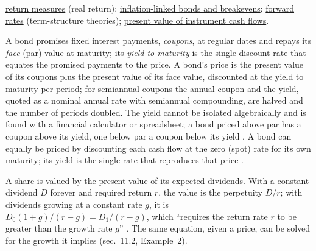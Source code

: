 \begin{qfdefinition}
 \hyperref[def:return-measures]{return measures} (real return); \hyperref[def:tips-breakevens]{inflation-linked bonds and breakevens}; \hyperref[mod:forward-rates-fra]{forward rates} (term-structure theories); \hyperref[meth:instrument-present-value]{present value of instrument cash flows}.

\end{qfdefinition}

\begin{qfmethod}\label{meth:instrument-present-value}
 A bond promises fixed interest payments, \emph{coupons}, at regular dates and repays its \emph{face} (par) value at maturity; its \emph{yield to maturity} is the single discount rate that equates the promised payments to the price. A bond's price is the present value of its coupons plus the present value of its face value, discounted at the yield to maturity per period; for semiannual coupons the annual coupon and the yield, quoted as a nominal annual rate with semiannual compounding, are halved and the number of periods doubled. The yield cannot be isolated algebraically and is found with a financial calculator or spreadsheet; a bond priced above par has a coupon above its yield, one below par a coupon below its yield \citep[sec.~10.2]{principles-of-finance-2026}. A bond can equally be priced by discounting each cash flow at the zero (spot) rate for its own maturity; its yield is the single rate that reproduces that price \citep[chap.~4, secs.~4.5--4.6, pp.~104--105]{s7-hulloptions}.

A share is valued by the present value of its expected dividends. With a constant dividend $D$ forever and required return $r$, the value is the perpetuity $D/r$; with dividends growing at a constant rate $g$, it is $D_0(1+g)/(r-g)=D_1/(r-g)$, which ``requires the return rate $r$ to be greater than the growth rate $g$'' \citep[sec.~11.2]{principles-of-finance-2026}. The same equation, given a price, can be solved for the growth it implies (sec.~11.2, Example~2).


\end{qfmethod}
